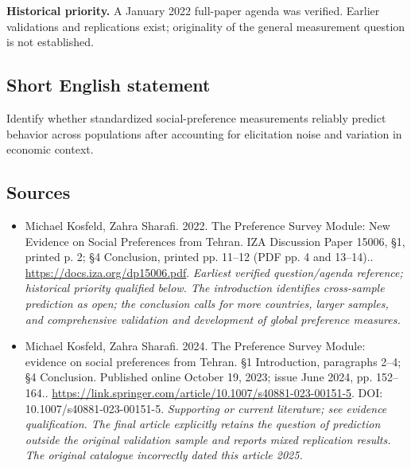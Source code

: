 \documentclass[11pt]{article}
\begin{document}
\par\textbf{Historical priority.} A January 2022 full-paper agenda was verified. Earlier validations and replications exist; originality of the general measurement question is not established.

\subsection{Short English statement}
Identify whether standardized social-preference measurements reliably predict behavior across populations after accounting for elicitation noise and variation in economic context.

\subsection{Sources}
\begin{itemize}\raggedright
\item[\textnormal{[S1]}]\hypertarget{source:30007585:1}{} Michael Kosfeld, Zahra Sharafi. 2022. The Preference Survey Module: New Evidence on Social Preferences from Tehran. IZA Discussion Paper 15006, §1, printed p. 2; §4 Conclusion, printed pp. 11–12 (PDF pp. 4 and 13–14)..
\url{https://docs.iza.org/dp15006.pdf}.
{\small\textit{Earliest verified question/agenda reference; historical priority qualified below. The introduction identifies cross-sample prediction as open; the conclusion calls for more countries, larger samples, and comprehensive validation and development of global preference measures.}}

\item[\textnormal{[S2]}]\hypertarget{source:30007585:2}{} Michael Kosfeld, Zahra Sharafi. 2024. The Preference Survey Module: evidence on social preferences from Tehran. §1 Introduction, paragraphs 2–4; §4 Conclusion. Published online October 19, 2023; issue June 2024, pp. 152–164..
\url{https://link.springer.com/article/10.1007/s40881-023-00151-5}.
DOI: 10.1007/s40881-023-00151-5.
{\small\textit{Supporting or current literature; see evidence qualification. The final article explicitly retains the question of prediction outside the original validation sample and reports mixed replication results. The original catalogue incorrectly dated this article 2025.}}
\end{itemize}
\end{document}
